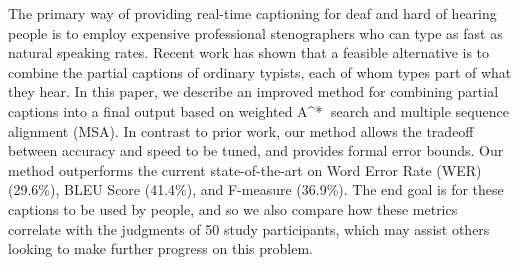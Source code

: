 The primary way of providing real-time captioning for deaf and hard of hearing people is to employ expensive professional stenographers who can type as fast
 as natural speaking rates. Recent work has shown that a feasible alternative is
 to combine the partial captions of ordinary typists, each of whom types part of
 what they hear. In this paper, we describe an improved method for combining
 partial captions into a final output based on weighted A^* search and multiple
 sequence alignment (MSA). In contrast to prior work, our method allows the
 tradeoff between accuracy and speed to be tuned, and provides formal error
 bounds. Our method outperforms the current state-of-the-art on Word Error Rate
 (WER) (29.6\%), BLEU Score (41.4\%), and F-measure (36.9\%). The end goal is for
 these captions to be used by people, and so we also compare how these metrics
 correlate with the judgments of 50 study participants, which may assist others
 looking to make further progress on this problem.


